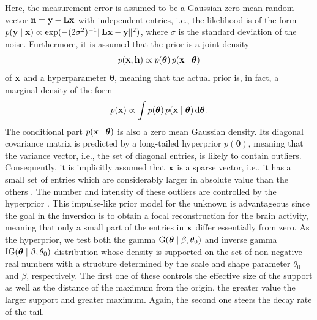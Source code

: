 \documentclass[5p]{elsarticle}
\begin{document}
Here, the measurement error is assumed to be a Gaussian zero mean random vector ${\bf n} = {\bf y} - {\bf L} {\bf x}$ with independent entries, i.e., the likelihood is of the form  $p({\bf y} \mid {\bf x}) \propto \exp ( - (2  \sigma^2)^{-1} \| {\bf L} {\bf x} - {\bf y}\|^2 )$, where $\sigma$ is the standard deviation of the noise. Furthermore, it is assumed that the prior is a joint density 
\begin{equation}
p ( {\bf x}, {\bf h}) \propto  p({\bm \theta}) \,  p ( {\bf x} \mid {\bm \theta})
\end{equation}
of ${\bf x}$ and a hyperparameter ${\bm \theta}$, meaning that the actual prior is, in fact, a marginal density of the form 
\begin{equation}
p ( {\bf x}) \propto  \int p({\bm \theta}) \,  p ( {\bf x} \mid {\bm \theta}) \, \hbox{d} {\bm \theta}. 
\end{equation}                                                                                                                                                                                        
The conditional part $p ( {\bf x} \mid {\bm \theta})$ is also a zero mean Gaussian density. Its diagonal covariance matrix is predicted by a long-tailed hyperprior $p ({\bm \theta})$, meaning that the variance vector, i.e., the set of diagonal entries, is likely to contain outliers. Consequently, it is implicitly assumed that ${\bf x}$ is a sparse vector, i.e., it has a small set of entries which are considerably larger in absolute value than the others \cite{sato2004hierarchical}. The number and intensity of these outliers are controlled by the hyperprior \cite{calvetti2007gaussian}. This impulse-like prior model for the unknown is  advantageous since the goal in the inversion is to obtain a focal reconstruction for the brain activity, meaning that only a small part of the entries in ${\bf x}$ differ essentially from zero. As the hyperprior, we test both the gamma $\hbox{G}({\bm \theta} \mid \beta, \theta_0)$ and inverse gamma $\hbox{IG}({\bm \theta} \mid \beta, \theta_0)$ distribution whose density  is supported on the set of non-negative real numbers with a structure determined by the scale  and shape parameter $\theta_0$ and $\beta$, respectively. The first one of these controls the effective size of the support as well as the distance of the maximum from the origin, the greater value the larger support and greater maximum. Again, the second one steers the decay rate of the tail. 
\end{document}
